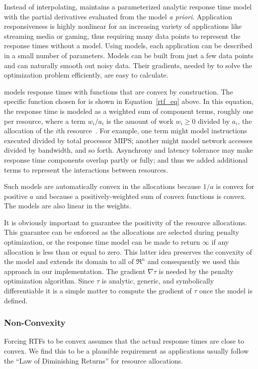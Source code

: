 Instead of interpolating, \pacora maintains a parameterized analytic response time model with the partial derivatives evaluated from the model \emph{a priori}. Application responsiveness is highly nonlinear for an increasing variety of applications like streaming media or gaming, thus requiring many data points to represent the response times without a model. Using models, each application can be described in a small number of parameters.  Models can be built from just a few data points and can naturally smooth out noisy data. Their gradients, needed by \pacora to solve the optimization problem efficiently, are easy to calculate.

\pacora models response times with functions that are convex by construction.
The specific function chosen for \pacora is shown in Equation~\ref{rtf_eq} above.
In this equation, the response time is modeled as a weighted sum of component terms,
roughly one per resource, where a term $w_i/a_i$ is the amount of work $w_i \geq 0$
divided by $a_i$, the allocation of the $i$th resource~\cite{Snav}.
For example, one term might model instructions executed divided by total processor MIPS;
another might model network accesses divided by bandwidth, and so forth.
Asynchrony and latency tolerance may make response time components overlap partly or fully; and thus we added additional terms to represent the interactions between resources.

Such models are automatically convex in the allocations because $1/a$ is convex for positive $a$ and because a positively-weighted sum of convex functions is convex.  The models are also linear in the weights.

It is obviously important to guarantee the positivity of the resource allocations. This guarantee can be enforced as the allocations are selected during penalty optimization, or the response time model can be made to return $\infty$ if any allocation is less than or equal to zero. This latter idea preserves the convexity of the model and extends its domain to all of $\Re^n$ and consequently we used this approach in our implementation.
The gradient $\nabla\tau$ is needed by the penalty optimization algorithm.
Since $\tau$ is analytic, generic, and symbolically differentiable
it is a simple matter to compute the gradient of $\tau$ once the model is defined.

\subsubsection{Non-Convexity}
Forcing RTFs to be convex assumes that the actual response times are
close to convex. We find this to be a plausible requirement as
applications usually follow the ``Law of Diminishing Returns'' for
resource allocations.

